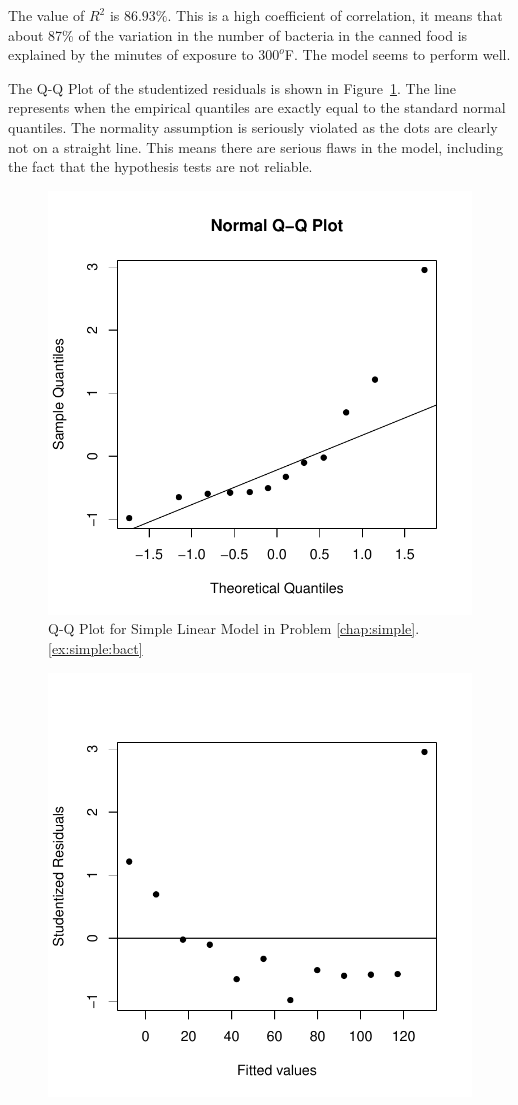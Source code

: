 \begin{solution}{2.22}
\begin{enumerate}
The value of $R^{2}$ is $86.93\%$. This is a high coefficient of correlation, it means that about 87\% of the variation in the number of bacteria in the canned food is explained by the minutes of exposure to $300^{o}$F. The model seems to perform well.

The Q-Q Plot of the studentized residuals is shown in Figure~\ref{fig:simple:bact2}. The line represents when the empirical quantiles are exactly equal to the standard normal quantiles. The normality assumption is seriously violated as the dots are clearly not on a straight line. This means there are serious flaws in the model, including the fact that the hypothesis tests are not reliable.

\begin{figure}
\begin{knitrout}
\color{fgcolor}

{\centering \includegraphics[width=.45\linewidth]{figure/fig-simple-bact2-1}

}



\end{knitrout}
\caption{Q-Q Plot for Simple Linear Model in Problem \ref{chap:simple}.\ref{ex:simple:bact}}
\label{fig:simple:bact2}
\end{figure}

\begin{figure}
\begin{knitrout}
\color{fgcolor}

{\centering \includegraphics[width=.45\linewidth]{figure/fig-simple-bact3-1}

}
\end{knitrout}
\end{figure}
\end{enumerate}
\end{solution}
